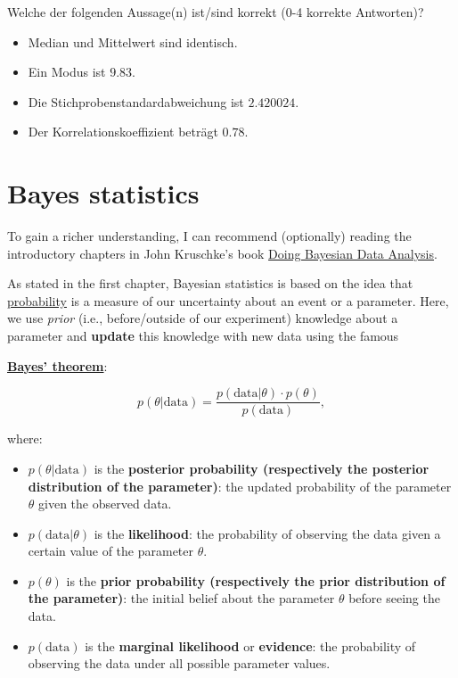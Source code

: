 \documentclass[
]{book}
\providecommand{\tightlist}{%
  \setlength{\itemsep}{0pt}\setlength{\parskip}{0pt}}
\begin{document}
Welche der folgenden Aussage(n) ist/sind korrekt (0-4 korrekte Antworten)?

\begin{itemize}
\tightlist
\item
  Median und Mittelwert sind identisch.
\item
  Ein Modus ist \(9.83\).
\item
  Die Stichprobenstandardabweichung ist \(2.420024\).
\item
  Der Korrelationskoeffizient beträgt \(0.78\).
\end{itemize}

\chapter{Bayes statistics}\label{bayes_statistics}

To gain a richer understanding, I can recommend (optionally) reading the introductory chapters in
John Kruschke's book \href{https://nyu-cdsc.github.io/learningr/assets/kruschke_bayesian_in_R.pdf}{Doing Bayesian Data Analysis}.

As stated in the first chapter, Bayesian statistics is based on the idea that
\href{https://en.wikipedia.org/wiki/Bayesian_probability}{probability} is a measure of our uncertainty about an event or a parameter.
Here, we use \emph{prior} (i.e., before/outside of our experiment) knowledge
about a parameter and \textbf{update} this knowledge with new data using the
famous

\textbf{\href{https://en.wikipedia.org/wiki/Bayes\%27_theorem}{Bayes' theorem}}:

\[
p(\theta | \text{data}) = \frac{p(\text{data} | \theta) \cdot p(\theta)}{p(\text{data})},
\]

where:

\begin{itemize}
\item
  \(p(\theta | \text{data})\) is the \textbf{posterior probability (respectively the posterior distribution of the parameter)}:
  the updated probability of the parameter \(\theta\) given the observed data.
\item
  \(p(\text{data} | \theta)\) is the \textbf{likelihood}: the probability of observing the data given a certain value of the parameter \(\theta\).
\item
  \(p(\theta)\) is the \textbf{prior probability (respectively the prior distribution of the parameter)}: the initial belief about the parameter \(\theta\) before seeing the data.
\item
  \(p(\text{data})\) is the \textbf{marginal likelihood} or \textbf{evidence}: the probability of observing the data under all possible parameter values.
\end{itemize}
\end{document}
